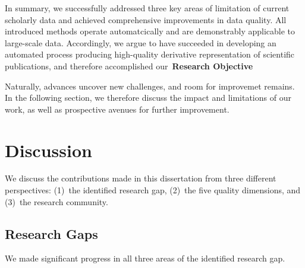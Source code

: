 In summary, we successfully addressed three key areas of limitation of current scholarly data and achieved comprehensive improvements in data quality. All introduced methods operate automatcically and are demonstrably applicable to large-scale data. %
Accordingly, we argue to have succeeded in developing an automated process producing high-quality derivative representation of scientific publications, and therefore accomplished our \textbf{{\color{objblue-box}\faCrosshairs}\,Research Objective \large\checkmark}

Naturally, advances uncover new challenges, and room for improvemet remains. In the following section, we therefore discuss the impact and limitations of our work, as well as prospective avenues for further improvement.


\section{Discussion}

We discuss the contributions made in this dissertation from three different perspectives: (1)~the identified research gap, (2)~the five quality dimensions, and (3)~the research community.


\subsection{Research Gaps}\label{sec:discussion-rgap}
We made significant progress in all three areas of the identified research gap.

